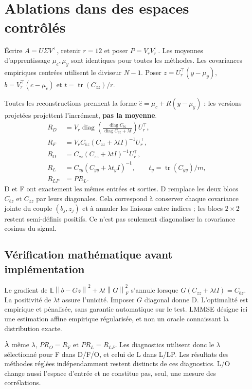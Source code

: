 \documentclass[11pt,a4paper]{article}
\newcommand{\norm}[1]{\left\lVert#1\right\rVert}
\begin{document}
\newpage
\section{Ablations dans des espaces contrôlés}\label{ablations}
Écrire $A=U\Sigma V^\top$, retenir $r=12$ et poser $P=V_rV_r^\top$. Les moyennes d'apprentissage $\mu_c,\mu_y$ sont identiques pour toutes les méthodes. Les covariances empiriques centrées utilisent le diviseur $N-1$. Poser $z=U_r^\top(y-\mu_y)$, $b=V_r^\top(c-\mu_c)$ et $t=\operatorname{tr}(C_{zz})/r$.

Toutes les reconstructions prennent la forme $\widehat c=\mu_c+R(y-\mu_y)$ : les versions projetées projettent l'incrément, \textbf{pas la moyenne}.
\begin{align*}
 R_D&=V_r\operatorname{diag}\!\left(\frac{\operatorname{diag}C_{bz}}{\operatorname{diag}C_{zz}+\lambda t}\right)U_r^\top,\\
 R_F&=V_r C_{bz}(C_{zz}+\lambda tI)^{-1}U_r^\top,\\
 R_O&=C_{cz}(C_{zz}+\lambda tI)^{-1}U_r^\top,\\
 R_L&=C_{cy}(C_{yy}+\lambda t_yI)^{-1},\qquad t_y=\operatorname{tr}(C_{yy})/m,\\
 R_{LP}&=P R_L.
\end{align*}
D et F ont exactement les mêmes entrées et sorties. D remplace les deux blocs $C_{bz}$ et $C_{zz}$ par leurs diagonales. Cela correspond à conserver chaque covariance jointe du couple $(b_j,z_j)$ et à annuler les liaisons entre indices ; les blocs $2\times2$ restent semi-définis positifs. Ce n'est pas seulement diagonaliser la covariance cosinus du signal.

\subsection{Vérification mathématique avant implémentation}
Le gradient de $\mathbb E\norm{b-Gz}^2+\lambda t\norm{G}_F^2$ s'annule lorsque $G(C_{zz}+\lambda tI)=C_{bz}$. La positivité de $\lambda t$ assure l'unicité. Imposer $G$ diagonal donne D. L'optimalité est empirique et pénalisée, sans garantie automatique sur le test. LMMSE désigne ici une estimation affine empirique régularisée, et non un oracle connaissant la distribution exacte.

À même $\lambda$, $PR_O=R_F$ et $PR_L=R_{LP}$. Les diagnostics utilisent donc le $\lambda$ sélectionné pour F dans D/F/O, et celui de L dans L/LP. Les résultats des méthodes réglées indépendamment restent distincts de ces diagnostics. L/O change aussi l'espace d'entrée et ne constitue pas, seul, une mesure des corrélations.
\end{document}
